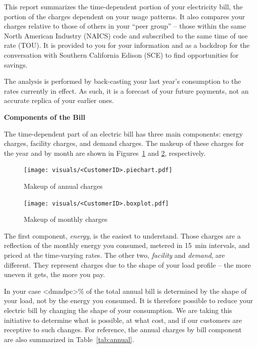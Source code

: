 \documentclass[11pt]{article}
\begin{document}
\pagestyle{title}
This report summarizes the time-dependent portion of your electricity bill, the portion of the charges dependent on your usage patterns.
It also compares your charges relative to those of others in your ``peer group'' -- those within the same North American Industry (NAICS) code and subscribed to the same time of use rate (TOU).
It is provided to you for your information and as a backdrop for the conversation with Southern California Edison (SCE) to find opportunities for savings.

The analysis is performed by back-casting your last year's consumption to the rates currently in effect.
As such, it is a forecast of your future payments, not an accurate replica of your earlier ones.

\vspace{3ex}
\textbf{\Large Components of the Bill}
\vspace{1ex}

The time-dependent part of an electric bill has three main components: energy charges, facility charges, and demand charges.
The makeup of these charges for the year and by month are shown in Figures~\ref{fig:pie} and \ref{fig:bars}, respectively.
\begin{figure}[!h]
\centering
\texttt{[image: visuals/<CustomerID>.piechart.pdf]}
\caption{Makeup of annual charges}
\label{fig:pie}
\end{figure}

\begin{figure}[!h]
\centering
\texttt{[image: visuals/<CustomerID>.boxplot.pdf]}
\caption{Makeup of monthly charges}
\label{fig:bars}
\end{figure}

The first component, \emph{energy}, is the easiest to understand.
Those charges are a reflection of the monthly energy you consumed, metered in 15~min intervals, and priced at the time-varying rates.
The other two, \emph{facility} and \emph{demand}, are different.
They represent charges due to the shape of your load profile -- the more uneven it gets, the more you pay.

In your case <dmndpc>\% of the total annual bill is determined by the shape of your load, not by the energy you consumed.
It is therefore possible to reduce your electric bill by changing the shape of your consumption.
We are taking this initiative to determine what is possible, at what cost, and if our customers are receptive to such changes.
For reference, the annual charges by bill component are also summarized in Table~\ref{tab:annual}.
\end{document}
